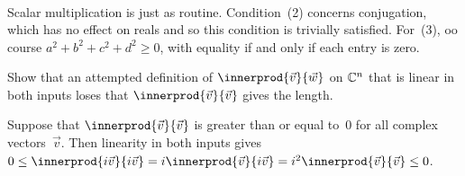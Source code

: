\begin{exercises}
\begin{answer}
\begin{multline*}
\end{multline*}
Scalar multiplication is just as routine.
Condition~(2) concerns conjugation, 
which has no effect on reals and 
so this condition is trivially satisfied. 
For~(3), oo course $a^2+b^2+c^2+d^2\geq 0$, with equality if and only
if each entry is zero.
\end{answer}
%
\item
Show that an attempted definition of $\innerprod{\vec{v}}{\vec{w}}$
on $\mathbb{C}^n$ that is linear in both inputs
loses that $\innerprod{\vec{v}}{\vec{v}}$ gives the length.
\begin{answer}
Suppose that
$\innerprod{\vec{v}}{\vec{v}}$ is greater than or equal to~$0$ for all
complex vectors~$\vec{v}$.
Then linearity in both inputs gives
$0\leq \innerprod{i\vec{v}}{i\vec{v}}
  =i\innerprod{\vec{v}}{i\vec{v}}
  =i^2\innerprod{\vec{v}}{\vec{v}}\leq 0$.
\end{answer}




\end{exercises}
\endinput
% 